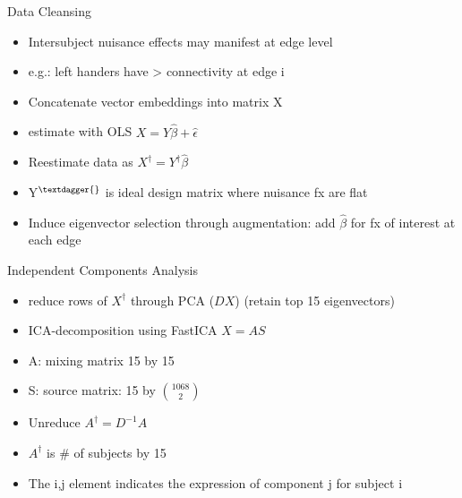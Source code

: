 \documentclass[presentation]{beamer}
\begin{document}
\begin{frame}[label={sec:orgheadline15}]{Data Cleansing}
\begin{itemize}
\item Intersubject nuisance effects may manifest at edge level
\item e.g.: left handers have > connectivity at edge i
\item Concatenate vector embeddings into matrix X
\item estimate with OLS \(X = Y\hat{\beta} + \hat{\epsilon}\)
\item Reestimate data as \(X^{\dagger} = Y^{\dagger}\hat{\beta}\)
\item Y\(^{\textdagger{}}\) is ideal design matrix where nuisance fx are flat
\item Induce eigenvector selection through augmentation: add \(\hat{\beta}\) for fx of interest at each edge
\end{itemize}
\end{frame}
\begin{frame}[label={sec:orgheadline16}]{Independent Components Analysis}
\begin{itemize}
\item reduce rows of \(X^{\dagger}\) through PCA (\(DX\)) (retain top 15 eigenvectors)
\item ICA-decomposition using FastICA \(X=AS\)
\item A: mixing matrix 15 by 15
\item S: source matrix: 15 by \({1068}\choose{2}\)
\item Unreduce \(A^{\dagger}=D^{-1}A\)
\item \(A^{\dagger}\) is \# of subjects by 15
\item The i,j element indicates the expression of component j for subject i
\end{itemize}
\end{frame}
\end{document}
